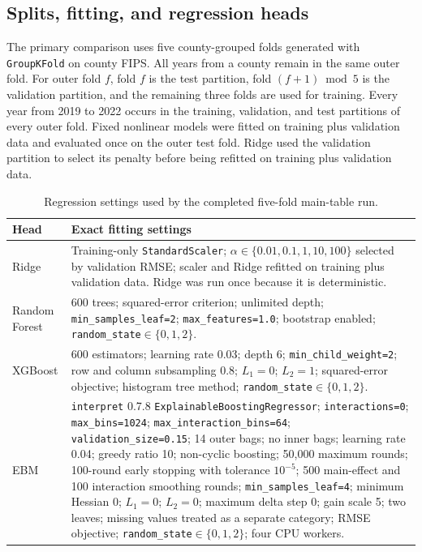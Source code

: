 \subsection{Splits, fitting, and regression heads}

The primary comparison uses five county-grouped folds generated with
\texttt{GroupKFold} on county FIPS.  All years from a county remain in the same
outer fold.  For outer fold $f$, fold $f$ is the test partition, fold
$(f+1)\bmod 5$ is the validation partition, and the remaining three folds are
used for training.  Every year from 2019 to 2022 occurs in the training,
validation, and test partitions of every outer fold.  Fixed nonlinear models
were fitted on training plus validation data and evaluated once on the outer
test fold.  Ridge used the validation partition to select its penalty before
being refitted on training plus validation data.

\begin{table}[t]
\centering
\caption{Regression settings used by the completed five-fold main-table run.}
\label{tab:regressor_settings_exact}
\scriptsize
\setlength{\tabcolsep}{4pt}
\renewcommand{\arraystretch}{1.12}
\begin{tabular}{p{2.1cm}p{13.6cm}}
\toprule
\textbf{Head} & \textbf{Exact fitting settings} \\
\midrule
Ridge & Training-only \texttt{StandardScaler}; $\alpha\in
\{0.01,0.1,1,10,100\}$ selected by validation RMSE; scaler and Ridge refitted
on training plus validation data.  Ridge was run once because it is
deterministic. \\

Random Forest & 600 trees; squared-error criterion; unlimited depth;
\texttt{min\_samples\_leaf=2}; \texttt{max\_features=1.0}; bootstrap enabled;
\texttt{random\_state}$\in\{0,1,2\}$. \\

XGBoost & 600 estimators; learning rate 0.03; depth 6;
\texttt{min\_child\_weight=2}; row and column subsampling 0.8; $L_1=0$;
$L_2=1$; squared-error objective; histogram tree method;
\texttt{random\_state}$\in\{0,1,2\}$. \\

EBM & \texttt{interpret} 0.7.8
\texttt{ExplainableBoostingRegressor}; \texttt{interactions=0};
\texttt{max\_bins=1024}; \texttt{max\_interaction\_bins=64};
\texttt{validation\_size=0.15}; 14 outer bags; no inner bags; learning rate
0.04; greedy ratio 10; non-cyclic boosting; 50,000 maximum rounds; 100-round
early stopping with tolerance $10^{-5}$; 500 main-effect and 100 interaction
smoothing rounds; \texttt{min\_samples\_leaf=4}; minimum Hessian 0; $L_1=0$;
$L_2=0$; maximum delta step 0; gain scale 5; two leaves; missing values treated
as a separate category; RMSE objective;
\texttt{random\_state}$\in\{0,1,2\}$; four CPU workers. \\
\bottomrule
\end{tabular}
\end{table}

